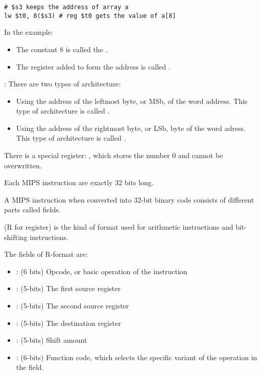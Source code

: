     \begin{lstlisting}
# $s3 keeps the address of array a
lw $t0, 8($s3) # reg $t0 gets the value of a[8]
    \end{lstlisting}

    \par In the example:
      \begin{itemize}
        \item The constant 8 is called the .
        \item The register added to form the address  is called
          .
      \end{itemize}

    \par {}: There are two types of architecture:
      \begin{itemize}
        \item Using the address of the leftmost byte, or MSb, of the word address.
          This type of architecture is called .
        \item Using the address of the rightmost byte, or LSb, byte of the word
          adress. This type of architecture is called .
      \end{itemize}

    \par There is a special register: , which stores the number 0 and
      cannot be overwritten.


  \par {}


  \par Each MIPS instruction are exactly 32 bits long.
  \par A MIPS instruction when converted into 32-bit binary code consists of
    different parts called fields.

    \par {} (R for register) is the kind of format used for
      arithmetic instructions and bit-shifting instructions.
    \par The fields of R-format are:
    \begin{itemize}
      \item {}: (6 bits) Opcode, or basic operation of the instruction
      \item {}: (5-bits) The first source register
      \item {}: (5-bits) The second source register
      \item {}: (5-bits) The destination register
      \item {}: (5-bits) Shift amount
      \item {}: (6-bits) Function code, which selects the specific
        variant of the operation in the  field.
    \end{itemize}

